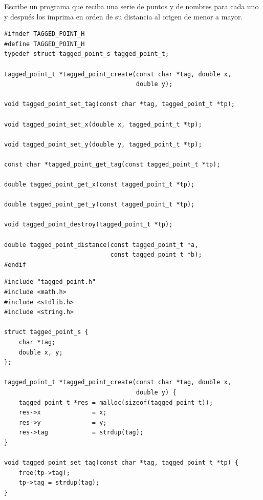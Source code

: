 \documentclass[a4paper]{article}
\begin{document}
\begin{exercises}
\item Escribe un programa que reciba una serie de puntos y de nombres para
cada uno y después los imprima en orden de su distancia al origen de menor a
mayor.

\noindent
\begin{minipage}[H]{\linewidth}
\mbox{}
\begin{lstlisting}[style=C,
caption={Solución al ejercicio 23 -- \texttt{tagged\_point.h}},
label={lst:solution23}]
#ifndef TAGGED_POINT_H
#define TAGGED_POINT_H
typedef struct tagged_point_s tagged_point_t;

tagged_point_t *tagged_point_create(const char *tag, double x,
                                    double y);

void tagged_point_set_tag(const char *tag, tagged_point_t *tp);

void tagged_point_set_x(double x, tagged_point_t *tp);

void tagged_point_set_y(double y, tagged_point_t *tp);

const char *tagged_point_get_tag(const tagged_point_t *tp);

double tagged_point_get_x(const tagged_point_t *tp);

double tagged_point_get_y(const tagged_point_t *tp);

void tagged_point_destroy(tagged_point_t *tp);

double tagged_point_distance(const tagged_point_t *a,
                             const tagged_point_t *b);
#endif
\end{lstlisting}
\end{minipage}

\noindent
\begin{minipage}[H]{\linewidth}
\mbox{}
\begin{lstlisting}[style=C,
caption={Solución al ejercicio 22 -- \texttt{tagged\_point.c}},
label={lst:solution22}]
#include "tagged_point.h"
#include <math.h>
#include <stdlib.h>
#include <string.h>

struct tagged_point_s {
    char *tag;
    double x, y;
};

tagged_point_t *tagged_point_create(const char *tag, double x,
                                    double y) {
    tagged_point_t *res = malloc(sizeof(tagged_point_t));
    res->x              = x;
    res->y              = y;
    res->tag            = strdup(tag);
}

void tagged_point_set_tag(const char *tag, tagged_point_t *tp) {
    free(tp->tag);
    tp->tag = strdup(tag);
}


\end{lstlisting}
\end{minipage}
\end{exercises}
\end{document}
